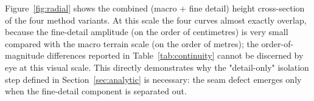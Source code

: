 Figure~\ref{fig:radial} shows the combined (macro + fine detail) height cross-section of the four method variants. At this scale the four curves almost exactly overlap, because the fine-detail amplitude (on the order of centimetres) is very small compared with the macro terrain scale (on the order of metres); the order-of-magnitude differences reported in Table~\ref{tab:continuity} cannot be discerned by eye at this visual scale. This directly demonstrates why the "detail-only" isolation step defined in Section~\ref{sec:analytic} is necessary: the seam defect emerges only when the fine-detail component is separated out.
